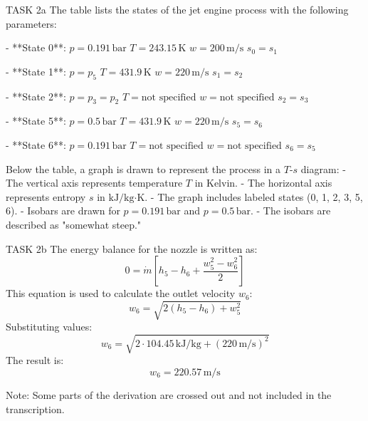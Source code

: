 TASK 2a  
The table lists the states of the jet engine process with the following parameters:  

- **State 0**:  
  \( p = 0.191 \, \text{bar} \)  
  \( T = 243.15 \, \text{K} \)  
  \( w = 200 \, \text{m/s} \)  
  \( s_0 = s_1 \)  

- **State 1**:  
  \( p = p_5 \)  
  \( T = 431.9 \, \text{K} \)  
  \( w = 220 \, \text{m/s} \)  
  \( s_1 = s_2 \)  

- **State 2**:  
  \( p = p_3 = p_2 \)  
  \( T = \text{not specified} \)  
  \( w = \text{not specified} \)  
  \( s_2 = s_3 \)  

- **State 5**:  
  \( p = 0.5 \, \text{bar} \)  
  \( T = 431.9 \, \text{K} \)  
  \( w = 220 \, \text{m/s} \)  
  \( s_5 = s_6 \)  

- **State 6**:  
  \( p = 0.191 \, \text{bar} \)  
  \( T = \text{not specified} \)  
  \( w = \text{not specified} \)  
  \( s_6 = s_5 \)  

Below the table, a graph is drawn to represent the process in a \( T \)-\( s \) diagram:  
- The vertical axis represents temperature \( T \) in Kelvin.  
- The horizontal axis represents entropy \( s \) in \( \text{kJ/kg·K} \).  
- The graph includes labeled states (0, 1, 2, 3, 5, 6).  
- Isobars are drawn for \( p = 0.191 \, \text{bar} \) and \( p = 0.5 \, \text{bar} \).  
- The isobars are described as "somewhat steep."  

TASK 2b  
The energy balance for the nozzle is written as:  
\[
0 = \dot{m} \left[ h_5 - h_6 + \frac{w_5^2 - w_6^2}{2} \right]
\]  
This equation is used to calculate the outlet velocity \( w_6 \):  
\[
w_6 = \sqrt{2 \left( h_5 - h_6 \right) + w_5^2}
\]  
Substituting values:  
\[
w_6 = \sqrt{2 \cdot 104.45 \, \text{kJ/kg} + (220 \, \text{m/s})^2}
\]  
The result is:  
\[
w_6 = 220.57 \, \text{m/s}
\]  

Note: Some parts of the derivation are crossed out and not included in the transcription.